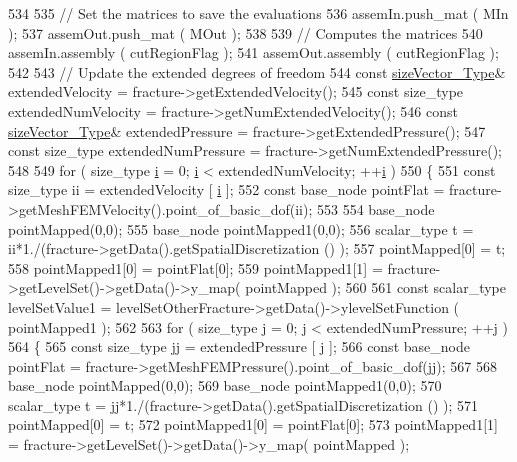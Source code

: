 \begin{DoxyCode}
534 
535     \textcolor{comment}{// Set the matrices to save the evaluations}
536     assemIn.push\_mat ( MIn );
537     assemOut.push\_mat ( MOut );
538 
539     \textcolor{comment}{// Computes the matrices}
540     assemIn.assembly ( cutRegionFlag );
541     assemOut.assembly ( cutRegionFlag );
542 
543     \textcolor{comment}{// Update the extended degrees of freedom}
544     \textcolor{keyword}{const} \hyperlink{Core_8h_a83c51913d041a5001e8683434c09857f}{sizeVector\_Type}& extendedVelocity = fracture->getExtendedVelocity();
545     \textcolor{keyword}{const} size\_type extendedNumVelocity = fracture->getNumExtendedVelocity();
546     \textcolor{keyword}{const} \hyperlink{Core_8h_a83c51913d041a5001e8683434c09857f}{sizeVector\_Type}& extendedPressure = fracture->getExtendedPressure();
547     \textcolor{keyword}{const} size\_type extendedNumPressure = fracture->getNumExtendedPressure();
548 
549     \textcolor{keywordflow}{for} ( size\_type \hyperlink{matrici_8m_a6f6ccfcf58b31cb6412107d9d5281426}{i} = 0; \hyperlink{matrici_8m_a6f6ccfcf58b31cb6412107d9d5281426}{i} < extendedNumVelocity; ++\hyperlink{matrici_8m_a6f6ccfcf58b31cb6412107d9d5281426}{i} )
550     \{
551         \textcolor{keyword}{const} size\_type ii = extendedVelocity [ \hyperlink{matrici_8m_a6f6ccfcf58b31cb6412107d9d5281426}{i} ];
552         \textcolor{keyword}{const} base\_node pointFlat = fracture->getMeshFEMVelocity().point\_of\_basic\_dof(ii);
553        
554         base\_node pointMapped(0,0);
555         base\_node pointMapped1(0,0);
556         scalar\_type t = ii*1./(fracture->getData().getSpatialDiscretization () );
557         pointMapped[0] = t;
558         pointMapped1[0] = pointFlat[0];
559         pointMapped1[1] = fracture->getLevelSet()->getData()->y\_map( pointMapped );
560 
561         \textcolor{keyword}{const} scalar\_type levelSetValue1 = levelSetOtherFracture->getData()->ylevelSetFunction ( 
      pointMapped1 );
562 
563         \textcolor{keywordflow}{for} ( size\_type j = 0; j < extendedNumPressure; ++j )
564         \{
565             \textcolor{keyword}{const} size\_type jj = extendedPressure [ j ];
566             \textcolor{keyword}{const} base\_node pointFlat = fracture->getMeshFEMPressure().point\_of\_basic\_dof(jj);
567             
568             base\_node pointMapped(0,0);
569             base\_node pointMapped1(0,0);
570             scalar\_type t = jj*1./(fracture->getData().getSpatialDiscretization () );
571             pointMapped[0] = t;
572             pointMapped1[0] = pointFlat[0];
573             pointMapped1[1] = fracture->getLevelSet()->getData()->y\_map( pointMapped );

\end{DoxyCode}
